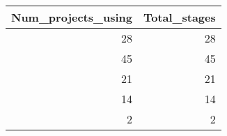 \begin{tabular}{rr}
\toprule
 Num\_projects\_using &  Total\_stages \\
\midrule
                 28 &            28 \\
                 45 &            45 \\
                 21 &            21 \\
                 14 &            14 \\
                  2 &             2 \\
\bottomrule
\end{tabular}
